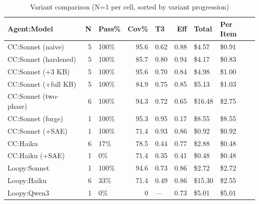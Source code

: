 \begin{table}[t]
\centering
\caption{Variant comparison (N=1 per cell, sorted by variant progression)}
\label{tab:variant-comparison}
\small
\begin{tabular}{lrlrlrll}
\toprule
 Agent:Model           &   N & Pass\%   &   Cov\% & T3   &   Eff & Total   & Per Item   \\
\midrule
 CC:Sonnet (naive)     &   5 & 100\%    &    95.6 & 0.62 &  0.88 & \$4.57  & \$0.91     \\
 CC:Sonnet (hardened)  &   5 & 100\%    &    85.7 & 0.80 &  0.94 & \$4.17  & \$0.83     \\
 CC:Sonnet (+3 KB)     &   5 & 100\%    &    95.6 & 0.70 &  0.84 & \$4.98  & \$1.00     \\
 CC:Sonnet (+full KB)  &   5 & 100\%    &    84.9 & 0.75 &  0.85 & \$5.13  & \$1.03     \\
 CC:Sonnet (two-phase) &   6 & 100\%    &    94.3 & 0.72 &  0.65 & \$16.48 & \$2.75     \\
 CC:Sonnet (forge)     &   1 & 100\%    &    95.3 & 0.95 &  0.17 & \$8.55  & \$8.55     \\
 CC:Sonnet (+SAE)      &   1 & 100\%    &    71.4 & 0.93 &  0.86 & \$0.92  & \$0.92     \\
 CC:Haiku              &   6 & 17\%     &    78.5 & 0.44 &  0.77 & \$2.88  & \$0.48     \\
 CC:Haiku (+SAE)       &   1 & 0\%      &    71.4 & 0.35 &  0.41 & \$0.48  & \$0.48     \\
 Loopy:Sonnet          &   1 & 100\%    &    94.6 & 0.73 &  0.86 & \$2.72  & \$2.72     \\
 Loopy:Haiku           &   6 & 33\%     &    71.4 & 0.49 &  0.86 & \$15.30 & \$2.55     \\
 Loopy:Qwen3           &   1 & 0\%      &     0   & ---  &  0.73 & \$5.01  & \$5.01     \\
\bottomrule
\end{tabular}
\end{table}
